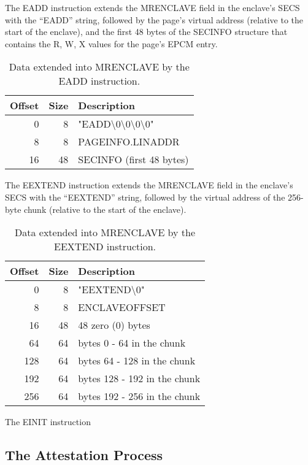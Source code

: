 
The EADD instruction extends the MRENCLAVE field in the enclave's SECS with the
``EADD'' string, followed by the page's virtual address (relative to the start
of the enclave), and the first 48 bytes of the SECINFO structure that contains
the R, W, X values for the page's EPCM entry.

\begin{table}[hbt]
  \centering
  \begin{tabularx}{\columnwidth}{| r | r | X |}
  \hline
  \textbf{Offset} & \textbf{Size} & \textbf{Description}\\
  \hline
  0 & 8 &
  "EADD\textbackslash{}0\textbackslash{}0\textbackslash{}0\textbackslash{}0" \\
  \hline
  8 & 8 & PAGEINFO.LINADDR \\
  \hline
  16 & 48 & SECINFO (first 48 bytes) \\
  \hline
  \end{tabularx}
  \caption{
    Data extended into MRENCLAVE by the EADD instruction.
  }
  \label{fig:eadd_mrenclave}
\end{table}


The EEXTEND instruction extends the MRENCLAVE field in the enclave's SECS with
the ``EEXTEND'' string, followed by the virtual address of the 256-byte chunk
(relative to the start of the enclave).

\begin{table}[hbt]
  \centering
  \begin{tabularx}{\columnwidth}{| r | r | X |}
  \hline
  \textbf{Offset} & \textbf{Size} & \textbf{Description}\\
  \hline
  0 & 8 & "EEXTEND\textbackslash{}0" \\
  \hline
  8 & 8 & ENCLAVEOFFSET \\
  \hline
  16 & 48 & 48 zero (0) bytes \\
  \hline
  \hline
  64 & 64 & bytes 0 - 64 in the chunk \\
  \hline
  \hline
  128 & 64 & bytes 64 - 128 in the chunk \\
  \hline
  \hline
  192 & 64 & bytes 128 - 192 in the chunk \\
  \hline
  \hline
  256 & 64 & bytes 192 - 256 in the chunk \\
  \hline
  \end{tabularx}
  \caption{
    Data extended into MRENCLAVE by the EEXTEND instruction.
  }
  \label{fig:eextend_mrenclave}
\end{table}


The EINIT instruction

\subsection{The Attestation Process}








